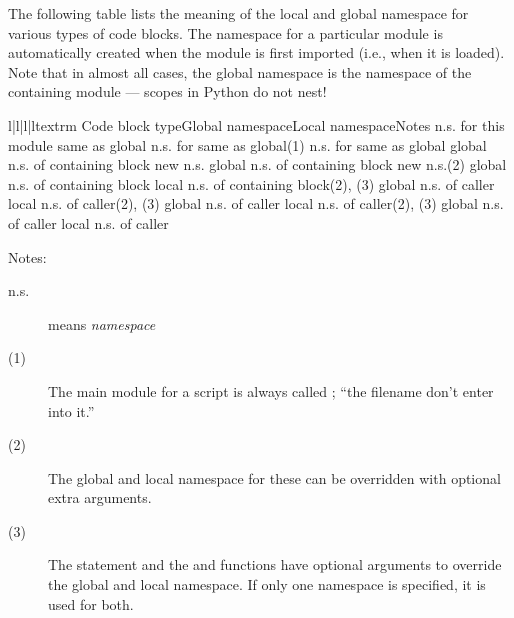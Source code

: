 The following table lists the meaning of the local and global
namespace for various types of code blocks.  The namespace for a
particular module is automatically created when the module is first
imported (i.e., when it is loaded).  Note that in almost all cases,
the global namespace is the namespace of the containing module ---
scopes in Python do not nest!

\begin{tableiv}{l|l|l|l}{textrm}%
  {Code block type}{Global namespace}{Local namespace}{Notes}
         {n.s. for this module}%
         {same as global}{}
         {n.s. for }%
         {same as global}{(1)}
         {n.s. for }%
         {same as global}{}
         {global n.s. of containing block}%
         {new n.s.}{}
         {global n.s. of containing block}%
         {new n.s.}{(2)}
         {global n.s. of containing block}%
         {local n.s. of containing block}{(2), (3)}
         {global n.s. of caller}%
         {local n.s. of caller}{(2), (3)}
         {global n.s. of caller}%
         {local n.s. of caller}{(2), (3)}
         {global n.s. of caller}%
         {local n.s. of caller}{}
\end{tableiv}

Notes:

\begin{description}

\item[n.s.] means \emph{namespace}

\item[(1)] The main module for a script is always called
; ``the filename don't enter into it.''

\item[(2)] The global and local namespace for these can be
overridden with optional extra arguments.

\item[(3)] The  statement and the  and
 functions have optional arguments to override
the global and local namespace.  If only one namespace is specified,
it is used for both.

\end{description}

